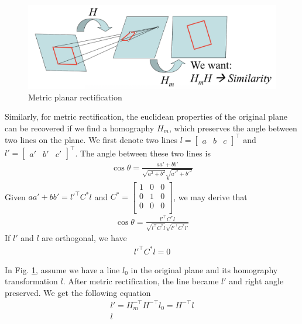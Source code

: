 \documentclass[11pt]{article}
\begin{document}
\begin{figure}[!h]
\begin{center}
\includegraphics[width=10 cm]{images/metric_rect.png}
\caption{Metric planar rectification}
\label{metric_rect}
\end{center}
\end{figure}
Similarly, for metric rectification, the euclidean properties of the original plane can be recovered if we find a homography $H_m$, which preserves the angle between two lines on the plane.
We first denote two lines $l=\left[\begin{array}{ccc}a & b & c\end{array}\right]^\top$ and $l'=\left[\begin{array}{ccc}a' & b' & c'\end{array}\right]^\top$. The angle between these two lines is
\begin{align*}
\cos\theta = \frac{aa'+bb'}{\sqrt{a^2+b^2}\sqrt{a'^2+b'^2}}
\end{align*}
Given $aa'+bb'=l'^\top C^\ast l$ and $C^\ast=\left[
      \begin{array}{ccc}
       1 & 0 & 0 \\
       0 & 1 & 0 \\
       0 & 0 & 0 \\
      \end{array}
\right]$, we may derive that
\begin{align*}
\cos\theta = \frac{l'^\top C^\ast l}{\sqrt{l^\top C^\ast l}\sqrt{l'^\top C^\ast l'}}
\end{align*}
If $l'$ and $l$ are orthogonal, we have 
\begin{align*}
l'^\top C^\ast l = 0
\end{align*}

In Fig. \ref{metric_rect}, assume we have a line $l_0$ in the original plane and its homography transformation $l$. After metric rectification, the line became $l'$ and right angle preserved. We get the following equation
\begin{align*}
l'=H^{-\top}_mH^{-\top}l_0=H^{-\top}l \\
l
\end{align*}
\end{document}
